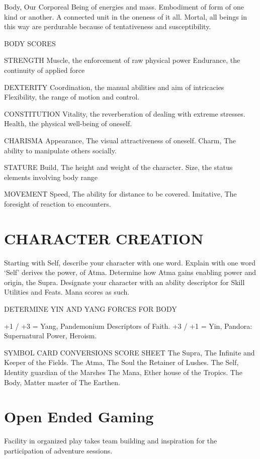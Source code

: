 \documentclass{article}
\begin{document}
Body, Our Corporeal Being of energies and mass. Embodiment of form of one kind or
another. A connected unit in the oneness of it all. Mortal, all beings in this way are perdurable
because of tentativeness and susceptibility.

BODY SCORES

STRENGTH
Muscle, the enforcement of raw physical power
Endurance, the continuity of applied force

DEXTERITY
Coordination, the manual abilities and aim of intricacies
Flexibility, the range of motion and control.

CONSTITUTION
Vitality, the reverberation of dealing with extreme stresses.
Health, the physical well-being of oneself.

CHARISMA
Appearance, The visual attractiveness of oneself.
Charm, The ability to manipulate others socially.

STATURE
Build, The height and weight of the character.
Size, the status elements involving body range

MOVEMENT
Speed, The ability for distance to be covered.
Imitative, The foresight of reaction to encounters.

\section{CHARACTER CREATION}

Starting with Self, describe your character with one word.
Explain with one word ‘Self’ derives the power, of Atma.
Determine how Atma gains enabling power and origin, the Supra.
Designate your character with an ability descriptor for Skill Utilities and Feats. Mana scores as
such.

DETERMINE YIN AND YANG FORCES FOR BODY

+1 / +3 = Yang, Pandemonium Descriptors of Faith.
+3 / +1 = Yin, Pandora: Supernatural Power, Heroism.

SYMBOL CARD CONVERSIONS SCORE SHEET
 The Supra, The Infinite and Keeper of the Fields.
 The Atma, The Soul the Retainer of Lushes.
 The Self, Identity guardian of the Marshes
 The Mana, Ether house of the Tropics.
 The Body, Matter master of The Earthen.




\section{Open Ended Gaming}

Facility in organized play takes team building and inspiration for the participation of adventure sessions.
\end{document}
